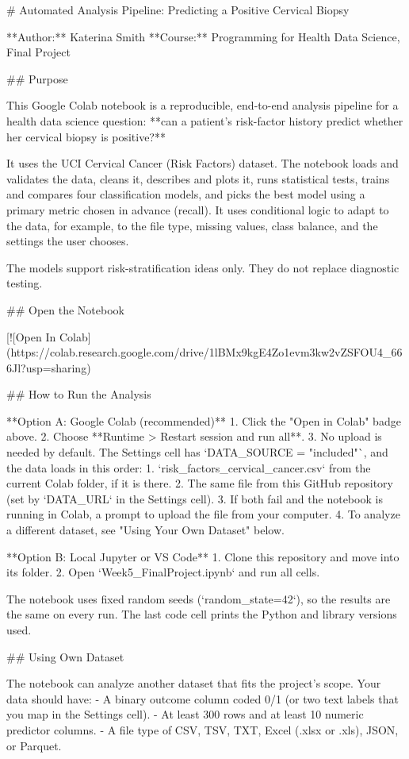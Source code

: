 # Automated Analysis Pipeline: Predicting a Positive Cervical Biopsy

**Author:** Katerina Smith
**Course:** Programming for Health Data Science, Final Project

## Purpose

This Google Colab notebook is a reproducible, end-to-end analysis pipeline for a health data science question: **can a patient's risk-factor history predict whether her cervical biopsy is positive?**

It uses the UCI Cervical Cancer (Risk Factors) dataset. The notebook loads and validates the data, cleans it, describes and plots it, runs statistical tests, trains and compares four classification models, and picks the best model using a primary metric chosen in advance (recall). It uses conditional logic to adapt to the data, for example, to the file type, missing values, class balance, and the settings the user chooses.

The models support risk-stratification ideas only. They do not replace diagnostic testing.

## Open the Notebook

[![Open In Colab](https://colab.research.google.com/drive/1lBMx9kgE4Zo1evm3kw2vZSFOU4_666Jl?usp=sharing)

## How to Run the Analysis

**Option A: Google Colab (recommended)**
1. Click the "Open in Colab" badge above.
2. Choose **Runtime > Restart session and run all**.
3. No upload is needed by default. The Settings cell has `DATA_SOURCE = "included"`, and the data loads in this order:
   1. `risk_factors_cervical_cancer.csv` from the current Colab folder, if it is there.
   2. The same file from this GitHub repository (set by `DATA_URL` in the Settings cell).
   3. If both fail and the notebook is running in Colab, a prompt to upload the file from your computer.
4. To analyze a different dataset, see "Using Your Own Dataset" below.

**Option B: Local Jupyter or VS Code**
1. Clone this repository and move into its folder.
2. Open `Week5_FinalProject.ipynb` and run all cells.

The notebook uses fixed random seeds (`random_state=42`), so the results are the same on every run. The last code cell prints the Python and library versions used.

## Using Own Dataset

The notebook can analyze another dataset that fits the project's scope. Your data should have:
- A binary outcome column coded 0/1 (or two text labels that you map in the Settings cell).
- At least 300 rows and at least 10 numeric predictor columns.
- A file type of CSV, TSV, TXT, Excel (.xlsx or .xls), JSON, or Parquet.

